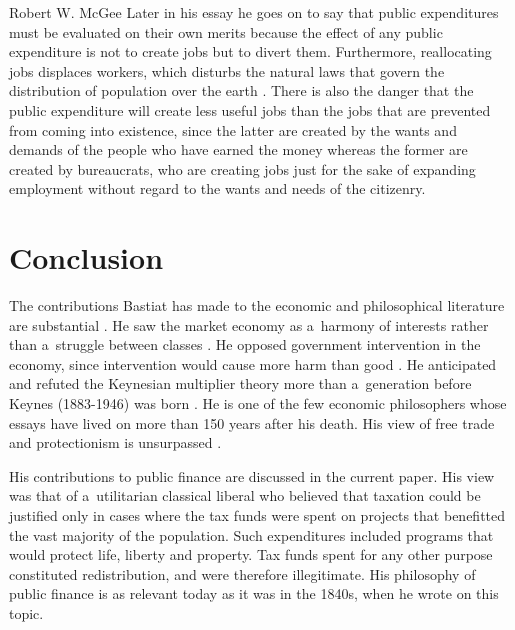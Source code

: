 \begin{artengenv}{Robert W. McGee}
Later in his essay he goes on to say that public expenditures must be evaluated on their own merits because the effect of any public expenditure is not to create jobs but to divert them. Furthermore, reallocating jobs displaces workers, which disturbs the natural laws that govern the distribution of population over the earth 
\parencite[][p.41]{bastiat_selected_1964}. %
 There is also the danger that the public expenditure will create less useful jobs than the jobs that are prevented from coming into existence, since the latter are created by the wants and demands of the people who have earned the money whereas the former are created by bureaucrats, who are creating jobs just for the sake of expanding employment without regard to the wants and needs of the citizenry.



\section{Conclusion}

The contributions Bastiat has made to the economic and philosophical literature are substantial 
\parencite[][]{mcgee_relevance_2014}. %
 He saw the market economy as a~harmony of interests rather than a~struggle between classes 
\parencite[][]{braun_bastiat_2011}. %
 He opposed government intervention in the economy, since intervention would cause more harm than good 
\parencite[][]{hulsmann_bastiats_2001}. %
 He anticipated and refuted the Keynesian multiplier theory more than a~generation before Keynes (1883-1946) was born 
\parencite[][]{mcgee_keynes_2014}. %
 He is one of the few economic philosophers whose essays have lived on more than 150 years after his death. His view of free trade and protectionism is unsurpassed 
\parencite[][]{mcgee_economic_2014}.%




His contributions to public finance are discussed in the current paper. His view was that of a~utilitarian classical liberal who believed that taxation could be justified only in cases where the tax funds were spent on projects that benefitted the vast majority of the population. Such expenditures included programs that would protect life, liberty and property. Tax funds spent for any other purpose constituted redistribution, and were therefore illegitimate. His philosophy of public finance is as relevant today as it was in the 1840s, when he wrote on this topic.




\end{artengenv}
\label{mcgee-last}
